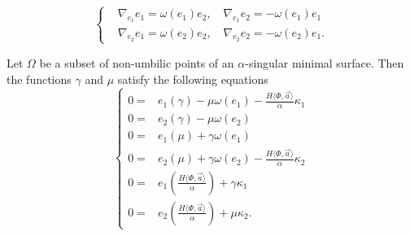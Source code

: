 \documentclass[10pt,a4paper]{amsart}
\begin{document}
\begin{equation}\label{eiej}
\left\{
\begin{split}
&\nabla_{e_1}e_1=\omega(e_1)e_2,\quad \nabla_{e_1}e_2=-\omega(e_1)e_1\\
&\nabla_{e_2}e_1=\omega(e_2)e_2,\quad \nabla_{e_2}e_2=-\omega(e_2)e_1.
\end{split}\right.
\end{equation}

\begin{lem}\label{l2}
Let $\Omega$ be a subset of non-umbilic points of an $\alpha$-singular minimal surface. Then the functions   $\gamma$ and $\mu$ satisfy the following equations
    \begin{equation}\label{d3}
    \left\{
\begin{split}
            0=&e_{1}(\gamma)-\mu\omega(e_1)-\frac{H\langle\Phi,\vec{a}\rangle}{\alpha}\kappa_1\\
            0=&e_{2}(\gamma)-\mu\omega(e_2) \\
            0=&e_{1}(\mu)+\gamma\omega(e_1)\\
           0= &e_{2}(\mu)+\gamma\omega(e_2)-\frac{H\langle\Phi,\vec{a}\rangle}{\alpha}\kappa_2\\
           0= &e_{1}(\frac{H\langle\Phi,\vec{a}\rangle}{\alpha})+\gamma\kappa_1\\
           0= &e_{2}(\frac{H\langle\Phi,\vec{a}\rangle}{\alpha})+\mu\kappa_2.
        \end{split}\right.
    \end{equation}
\end{lem}
\end{document}
